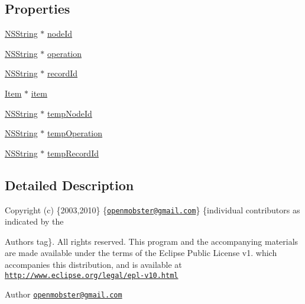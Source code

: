 \subsection*{\-Properties}
\begin{DoxyCompactItemize}
\item 
\hyperlink{class_n_s_string}{\-N\-S\-String} $\ast$ \hyperlink{interface_change_log_entry_acce3a7447e5dd680cf737498f6f33a5b}{node\-Id}
\item 
\hyperlink{class_n_s_string}{\-N\-S\-String} $\ast$ \hyperlink{interface_change_log_entry_acac7f186263ef0506e163b7a39c56a20}{operation}
\item 
\hyperlink{class_n_s_string}{\-N\-S\-String} $\ast$ \hyperlink{interface_change_log_entry_aaee4caa1d7dc9d8facf2babcd498fbbc}{record\-Id}
\item 
\hyperlink{interface_item}{\-Item} $\ast$ \hyperlink{interface_change_log_entry_a1f6df0c1b0e8520df285a0db6f65bff2}{item}
\item 
\hyperlink{class_n_s_string}{\-N\-S\-String} $\ast$ \hyperlink{interface_change_log_entry_a6c9aaabba3901d8deadaeac3b32eaa34}{temp\-Node\-Id}
\item 
\hyperlink{class_n_s_string}{\-N\-S\-String} $\ast$ \hyperlink{interface_change_log_entry_ad66e615443cd07dbe88b2d6e56d63258}{temp\-Operation}
\item 
\hyperlink{class_n_s_string}{\-N\-S\-String} $\ast$ \hyperlink{interface_change_log_entry_a6f640615260a2047d74e4c35e005a5c8}{temp\-Record\-Id}
\end{DoxyCompactItemize}


\subsection{\-Detailed \-Description}
\-Copyright (c) \{2003,2010\} \{\href{mailto:openmobster@gmail.com}{\tt openmobster@gmail.\-com}\} \{individual contributors as indicated by the \begin{DoxyAuthor}{\-Authors}
tag\}. \-All rights reserved. \-This program and the accompanying materials are made available under the terms of the \-Eclipse \-Public \-License v1. which accompanies this distribution, and is available at \href{http://www.eclipse.org/legal/epl-v10.html}{\tt http\-://www.\-eclipse.\-org/legal/epl-\/v10.\-html}
\end{DoxyAuthor}
\begin{DoxyAuthor}{\-Author}
\href{mailto:openmobster@gmail.com}{\tt openmobster@gmail.\-com} 
\end{DoxyAuthor}


